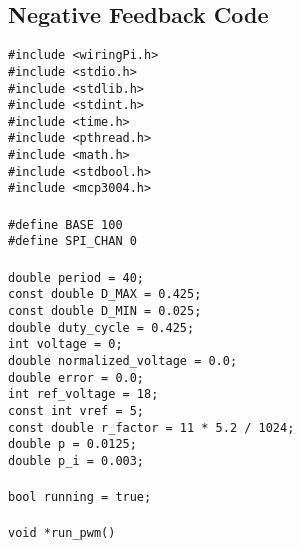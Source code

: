 \documentclass[a4paper, 12pt]{article}
\begin{document}
\newpage
\begin{appendices}
	\section{Negative Feedback Code}
	\label{sec:feedback_code}
	\texttt{\#include <wiringPi.h>} \\\noindent
	\texttt{\#include <stdio.h>} \\\noindent
	\texttt{\#include <stdlib.h>} \\\noindent
	\texttt{\#include <stdint.h>} \\\noindent
	\texttt{\#include <time.h>} \\\noindent
	\texttt{\#include <pthread.h>} \\\noindent
	\texttt{\#include <math.h>} \\\noindent
	\texttt{\#include <stdbool.h>} \\\noindent
	\texttt{\#include <mcp3004.h>} \\\noindent
	\texttt{ \\\noindent}
	\texttt{\#define BASE 100} \\\noindent
	\texttt{\#define SPI\_CHAN 0} \\\noindent
	\texttt{ \\\noindent}
	\texttt{double period = 40;} \\\noindent
	\texttt{const double D\_MAX = 0.425;} \\\noindent
	\texttt{const double D\_MIN = 0.025;} \\\noindent
	\texttt{double duty\_cycle = 0.425;} \\\noindent
	\texttt{int voltage = 0;} \\\noindent
	\texttt{double normalized\_voltage = 0.0;} \\\noindent
	\texttt{double error = 0.0;} \\\noindent
	\texttt{int ref\_voltage = 18;} \\\noindent
	\texttt{const int vref = 5;} \\\noindent
	\texttt{const double r\_factor = 11 * 5.2 / 1024;} \\\noindent
	\texttt{double p = 0.0125;} \\\noindent
	\texttt{double p\_i = 0.003;} \\\noindent
	\texttt{ \\\noindent}
	\texttt{bool running = true;} \\\noindent
	\texttt{ \\\noindent}
	\texttt{void *run\_pwm()} \\\noindent

\end{appendices}
\end{document}
